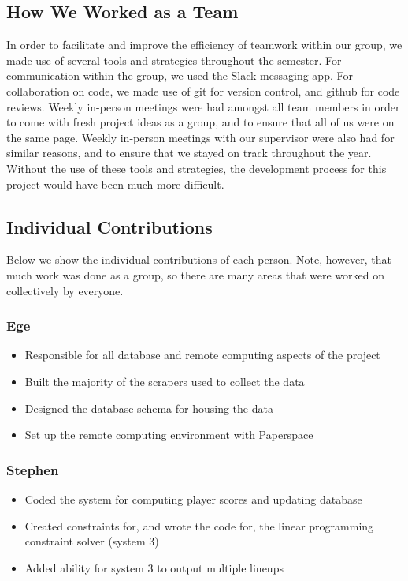 \subsection{How We Worked as a Team}
In order to facilitate and improve the efficiency of teamwork within our group, we made use of several tools and strategies throughout the semester. For communication within the group, we used the Slack messaging app. For collaboration on code, we made use of git for version control, and github for code reviews. Weekly in-person meetings were had amongst all team members in order to come with fresh project ideas as a group, and to ensure that all of us were on the same page. Weekly in-person meetings with our supervisor were also had for similar reasons, and to ensure that we stayed on track throughout the year. Without the use of these tools and strategies, the development process for this project would have been much more difficult.

\subsection{Individual Contributions}
Below we show the individual contributions of each person. Note, however, that much work was done as a group, so there are many areas that were worked on collectively by everyone.

\subsubsection{Ege}
\begin{itemize}
  \item Responsible for all database and remote computing aspects of the project
  \item Built the majority of the scrapers used to collect the data
  \item Designed the database schema for housing the data
  \item Set up the remote computing environment with Paperspace
\end{itemize}

\subsubsection{Stephen}
\begin{itemize}
  \item Coded the system for computing player scores and updating database
  \item Created constraints for, and wrote the code for, the linear programming constraint solver (system 3)
  \item Added ability for system 3 to output multiple lineups
\end{itemize}
